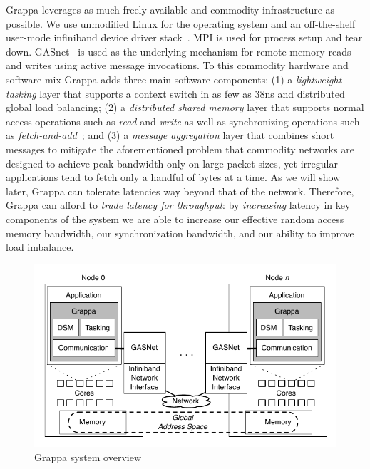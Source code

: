 Grappa leverages as much freely available and commodity infrastructure as possible. We use unmodified Linux for the operating system and an off-the-shelf user-mode infiniband device driver stack~\cite{OFED}. MPI is used for process setup and tear down. GASnet~\cite{gasnet} is used as the underlying mechanism for remote memory reads and writes using active message invocations. To this commodity hardware and software mix Grappa adds three main software components: (1) a \emph{lightweight tasking\/} layer that supports a context switch in as few as 38ns and distributed global load balancing; (2) a \emph{distributed shared memory\/} layer that supports normal access operations such as \emph{read\/} and \emph{write\/} as well as synchronizing operations such as \emph{fetch-and-add\/}~\cite{fetchandadd}; and (3) a \emph{message aggregation\/} layer that combines short messages to mitigate the aforementioned problem that commodity networks are designed to achieve peak bandwidth only on large packet sizes, yet irregular applications tend to fetch only a handful of bytes at a time. As we will show later, Grappa can tolerate latencies way beyond that of the network. Therefore, Grappa can afford to \emph{trade latency for throughput\/}: by {\em increasing\/} latency in key components of the system we are able to increase our effective random access memory bandwidth, our synchronization bandwidth, and our ability to improve load imbalance.

\begin{figure}[t]
\begin{center}     
  \includegraphics[width=0.95\columnwidth]{figs/system-overview}
\begin{minipage}{0.95\columnwidth} 
  \caption{\label{fig:grappa} Grappa system overview}
\end{minipage}
\vspace{-3ex}
\end{center}
\end{figure}

